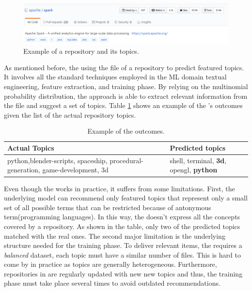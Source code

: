 \begin{figure}[h!]
	\centering
	\includegraphics[width=0.99\linewidth]{figs/spark_topics.png}
	\caption{Example of a \GH repository and its topics.}
	\label{fig:spark}
\end{figure}

As mentioned before, the \MNB using the \RM file of a repository to predict featured topics. It involves all the standard techniques employed in the ML domain \ie textual engineering, feature extraction, and training phase. By relying on the multinomial probability distribution, the approach is able to extract relevant information from the \RM file and suggest a set of topics. Table \ref{tab:example} shows an example of the \MNB's outcomes given the list of the actual repository topics. 

\begin{table}[h]
\centering

\resizebox{8.5cm}{!} {

\begin{tabular}{| p{3.2cm} | p{3.2cm} | }
\hline
 \textbf{Actual Topics} &\textbf{ Predicted topics} \\ \hline
     python,blender-scripts, spaceship, procedural-generation, game-development, 3d        &  
  shell, terminal, \textbf{3d},	opengl,	\textbf{python}        \\ \hline

\end{tabular}
}
\caption{Example of the \MNB outcomes.}
\label{tab:example}
\end{table} 


Even though the \MNB works in practice, it suffers from some limitations. First, the underlying model can recommend only featured topics that represent only a small set of all possible terms that can be restricted because of antonymous term(\eg programming languages).
In this way, the \MNB doesn't express all the concepts covered by a \GH repository. As shown in the table, only two of the predicted topics matched with the real ones. The second major limitation is the underlying structure needed for the training phase. To deliver relevant items, the \MNB requires a \emph{balanced} dataset, \ie each topic must have a similar number of  \RM files. This is hard to come by in practice as topics are generally heterogeneous.
Furthermore, repositories in \GH are regularly updated with new new topics and thus, the training phase must take place several times to avoid outdated recommendations. 